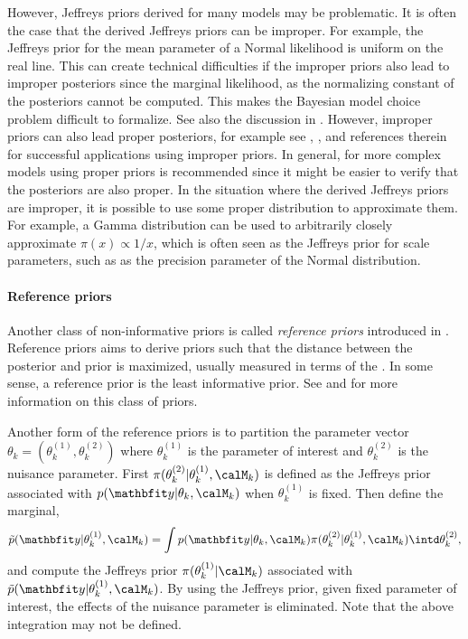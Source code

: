 However, Jeffreys priors derived for many models may be problematic. It is
often the case that the derived Jeffreys priors can be improper. For example,
the Jeffreys prior for the mean parameter of a Normal likelihood is uniform on
the real line. This can create technical difficulties if the improper priors
also lead to improper posteriors since the marginal likelihood, as the
normalizing constant of the posteriors cannot be computed. This makes the
Bayesian model choice problem difficult to formalize. See also the discussion
in \cite{Kass:1995vb}. However, improper priors can also lead proper
posteriors, for example see \cite[][sec.~2.9]{Gelman:2003vx},
\cite[][sec.~1.5]{Robert:2007tc}, \cite{Kass:1995vb} and references therein
for successful applications using improper priors. In general, for more
complex models using proper priors is recommended since it might be easier to
verify that the posteriors are also proper. In the situation where the derived
Jeffreys priors are improper, it is possible to use some proper distribution
to approximate them. For example, a Gamma distribution can be used to
arbitrarily closely approximate $\pi(x)\propto1/x$, which is often seen as the
Jeffreys prior for scale parameters, such as as the precision parameter of the
Normal distribution.

\paragraph{Reference priors}

Another class of non-informative priors is called \emph{reference priors}
introduced in \cite{Bernardo:1979uq}. Reference priors aims to derive priors
such that the distance between the posterior and prior is maximized, usually
measured in terms of the \kld \cite{Kullback:1951va}. In some sense, a
reference prior is the least informative prior. See \cite{Berger:1989vj,
  Berger:1992kf, Berger:1992wo} and \cite[][sec.~5.4]{Bernardo:1994vd} for
more information on this class of priors.

Another form of the reference priors is to partition the parameter vector
$\theta_k = (\theta_k^{(1)},\theta_k^{(2)})$ where $\theta_k^{(1)}$ is the
parameter of interest and $\theta_k^{(2)}$ is the nuisance parameter.  First
$\pi(\theta_k^{(2)}|\theta_k^{(1)},\calM_k)$ is defined as the Jeffreys prior
associated with $p(\data|\theta_k,\calM_k)$ when $\theta_k^{(1)}$ is fixed.
Then define the marginal,
\begin{equation}
  \tilde{p}(\data|\theta_k^{(1)},\calM_k) =
  \int p(\data|\theta_k,\calM_k)\pi(\theta_k^{(2)}|\theta_k^{(1)},\calM_k)
  \intd \theta_k^{(2)},
\end{equation}
and compute the Jeffreys prior $\pi(\theta_k^{(1)}|\calM_k)$ associated with
$\tilde{p}(\data|\theta_k^{(1)},\calM_k)$. By using the Jeffreys prior, given
fixed parameter of interest, the effects of the nuisance parameter is
eliminated. Note that the above integration may not be defined.

